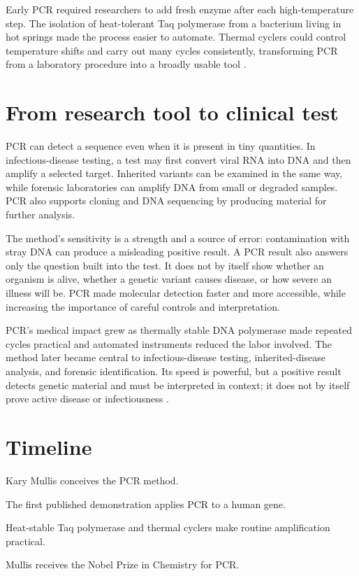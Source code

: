 \documentclass[12pt,oneside]{book}
\begin{document}
Early PCR required researchers to add fresh enzyme after each high-temperature
step. The isolation of heat-tolerant Taq polymerase from a bacterium living in
hot springs made the process easier to automate. Thermal cyclers could control
temperature shifts and carry out many cycles consistently, transforming PCR
from a laboratory procedure into a broadly usable tool
\cite{nobelPCR,saikiTaqPCR}.

\section{From research tool to clinical test}
PCR can detect a sequence even when it is present in tiny quantities. In
infectious-disease testing, a test may first convert viral RNA into DNA and
then amplify a selected target. Inherited variants can be examined in the
same way, while forensic laboratories can amplify DNA from small or degraded
samples. PCR also supports cloning and DNA sequencing by producing material
for further analysis.

The method's sensitivity is a strength and a source of error: contamination
with stray DNA can produce a misleading positive result. A PCR result also
answers only the question built into the test. It does not by itself show
whether an organism is alive, whether a genetic variant causes disease, or
how severe an illness will be. PCR made molecular detection faster and more
accessible, while increasing the importance of careful controls and
interpretation.

PCR’s medical impact grew as thermally stable DNA polymerase made repeated
cycles practical and automated instruments reduced the labor involved. The
method later became central to infectious-disease testing, inherited-disease
analysis, and forensic identification. Its speed is powerful, but a positive
result detects genetic material and must be interpreted in context; it does
not by itself prove active disease or infectiousness
\cite{saikiTaqPCR,nobelPCR}.

\section*{Timeline}
\begin{description}[leftmargin=2.3cm,style=nextline]
  \item[1983] Kary Mullis conceives the PCR method.
  \item[1985] The first published demonstration applies PCR to a human gene.
  \item[Late 1980s] Heat-stable Taq polymerase and thermal cyclers make routine amplification practical.
  \item[1993] Mullis receives the Nobel Prize in Chemistry for PCR.
\end{description}
\end{document}
